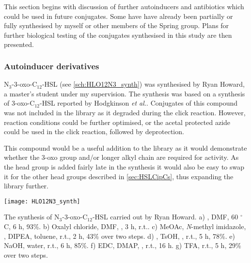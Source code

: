 

This section begins with discussion of further autoinducers and antibiotics which could be used in future conjugates. 
Some have have already been partially or fully synthesised by myself or other members of the Spring group.
Plans for further biological testing of the conjugates synthesised in this study are then presented.

\subsubsection{Autoinducer derivatives}


N$_3$-3-oxo-C$_{12}$-HSL  (see \ref{sch:HLO12N3_synth}) was synthesised by Ryan Howard, a master's student under my supervision. The synthesis was based on a synthesis of 3-oxo-C$_{12}$-HSL  reported by Hodgkinson \textit{et al.}\cite{Hodgkinson2011}. 
Conjugates of this compound was not included in the library as it degraded during the click reaction. However, reaction conditions could be further optimised, or the acetal protected azide  could be used in the click reaction, followed by deprotection.

This compound would be a useful addition to the library as it would demonstrate whether the 3-oxo group and/or longer alkyl chain are required for activity. As the head group is added fairly late in the synthesis it would also be easy to swap it for the other head groups described in \ref{sec:HSLCipCs}, thus expanding the library further.

\begin{scheme}[H]
	\begin{center}
		\texttt{[image: HLO12N3\_synth]}
		\caption{The synthesis of N$_3$-3-oxo-C$_{12}$-HSL  carried out by Ryan Howard.
		a) , DMF, 60 $^{\circ}$C, 6 h, 93\%.
		b) Oxalyl chloride, DMF, , 3 h, r.t..
		c) MeOAc, \textit{N}-methyl imidazole, , DIPEA, toluene, r.t., 2 h, 43\% over two steps.
		d) , TsOH, , r.t., 5 h, 78\%.
		e) NaOH, water, r.t., 6 h, 85\%.
		f) EDC, DMAP, , r.t., 16 h.
		g) TFA, r.t., 5 h, 29\% over two steps.
		\label{sch:HLO12N3_synth}}
	\end{center}
\end{scheme}

